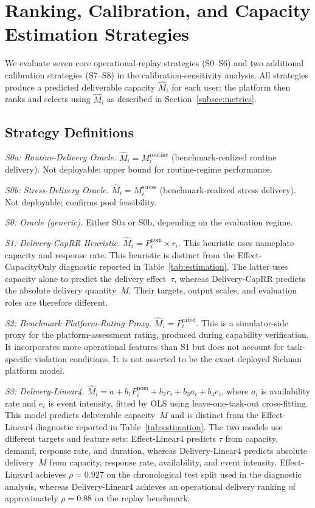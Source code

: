 \documentclass[utf8]{FrontiersinHarvard}
\newcommand{\Mhat}{\widehat{M}}
\begin{document}
\section{Ranking, Calibration, and Capacity Estimation Strategies}
\label{sec:methods}

We evaluate seven core operational-replay strategies (S0--S6)
and two additional calibration strategies (S7--S8) in the
calibration-sensitivity analysis. All strategies produce a
predicted deliverable capacity $\Mhat_i$ for each user; the
platform then ranks and selects using $\Mhat_i$ as described in
Section~\ref{subsec:metrics}.

\subsection{Strategy Definitions}

\textit{S0a: Routine-Delivery Oracle.}
$\Mhat_i = M_i^{\mathrm{routine}}$ (benchmark-realized routine
delivery). Not deployable; upper bound for routine-regime
performance.

\textit{S0b: Stress-Delivery Oracle.}
$\Mhat_i = M_i^{\mathrm{stress}}$ (benchmark-realized stress
delivery). Not deployable; confirms pool feasibility.

\textit{S0: Oracle (generic).} Either S0a or S0b, depending on
the evaluation regime.

\textit{S1: Delivery-CapRR Heuristic.}
$\Mhat_i = P_i^{\mathrm{nom}} \times r_i$. This heuristic
uses nameplate capacity and response rate. This heuristic is
distinct from the Effect-CapacityOnly diagnostic reported in
Table~\ref{tab:estimation}. The latter uses capacity alone to
predict the delivery effect~$\tau$, whereas Delivery-CapRR
predicts the absolute delivery quantity~$M$. Their targets,
output scales, and evaluation roles are therefore different.

\textit{S2: Benchmark Platform-Rating Proxy.}
$\Mhat_i = $$P_i^{\mathrm{rated}}$.
This is a simulator-side proxy for the platform-assessment rating,
produced during capability verification. It incorporates more
operational features than S1 but does not account for
task-specific violation conditions. It is not asserted to be the
exact deployed Sichuan platform model.

\textit{S3: Delivery-Linear4.}
$\Mhat_i = a + b_1 P_i^{\mathrm{nom}} + b_2 r_i + b_3 a_i + b_4
e_i$, where $a_i$ is availability rate and $e_i$ is event
intensity, fitted by OLS using leave-one-task-out cross-fitting.
This model predicts deliverable capacity~$M$ and is distinct
from the Effect-Linear4 diagnostic reported in
Table~\ref{tab:estimation}. The two models use different targets
and feature sets: Effect-Linear4 predicts $\tau$ from capacity,
demand, response rate, and duration, whereas Delivery-Linear4
predicts absolute delivery~$M$ from capacity, response rate,
availability, and event intensity. Effect-Linear4 achieves
$\rho = 0.927$ on the chronological test split used in the
diagnostic analysis, whereas Delivery-Linear4 achieves an
operational delivery ranking of approximately $\rho = 0.88$ on
the replay benchmark.
\end{document}
